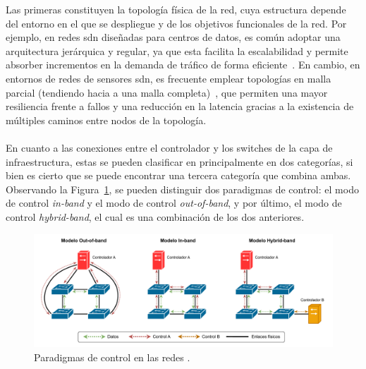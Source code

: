 Las primeras constituyen la topología física de la red, cuya estructura depende del entorno en el que se despliegue y de los objetivos funcionales de la red. Por ejemplo, en redes \gls{sdn} diseñadas para centros de datos, es común adoptar una arquitectura jerárquica y regular, ya que esta facilita la escalabilidad y permite absorber incrementos en la demanda de tráfico de forma eficiente~\cite{lopez2021nuevos}. En cambio, en entornos de redes de sensores \gls{sdn}, es frecuente emplear topologías en malla parcial (tendiendo hacia a una malla completa)~\cite{baddeley2018evolving}, que permiten una mayor resiliencia frente a fallos y una reducción en la latencia gracias a la existencia de múltiples caminos entre nodos de la topología.\\
\\
En cuanto a las conexiones entre el controlador y los switches de la capa de infraestructura, estas se pueden clasificar en principalmente en dos categorías, si bien es cierto que se puede encontrar una tercera categoría que combina ambas. Observando la Figura~\ref{fig:sdn_control_paradigms}, se pueden distinguir dos paradigmas de control: el modo de control \textit{in-band} y el modo de control \textit{out-of-band}, y por último, el modo de control \textit{hybrid-band}, el cual es una combinación de los dos anteriores. \\

\begin{figure}[ht!]
\centering
\includegraphics[width=\textwidth]{fig/02_sota/sota_5_sdn_control_paradigms.drawio.pdf}
\caption{Paradigmas de control en las redes .}
\label{fig:sdn_control_paradigms}
\end{figure}

